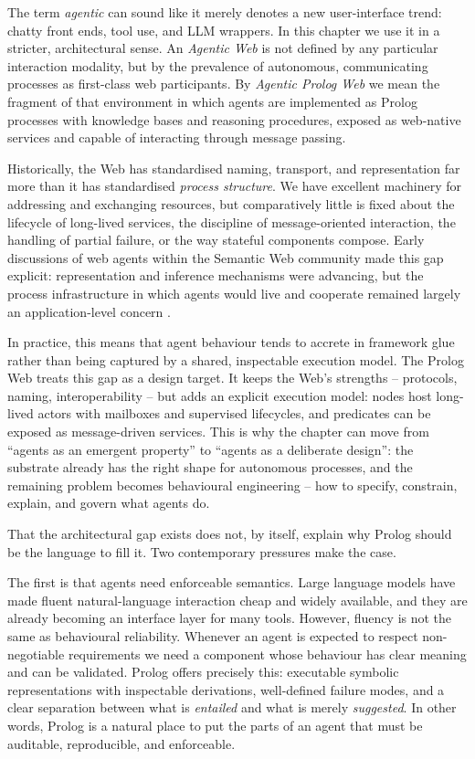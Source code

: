 The term \emph{agentic} can sound like it merely denotes a new user-interface trend: chatty front ends, tool use, and LLM wrappers. In this chapter we use it in a stricter, architectural sense. An \emph{Agentic Web} is not defined by any particular interaction modality, but by the prevalence of autonomous, communicating processes as first-class web participants. By \emph{Agentic Prolog Web} we mean the fragment of that environment in which agents are implemented as Prolog processes with knowledge bases and reasoning procedures, exposed as web-native services and capable of interacting through message passing.

Historically, the Web has standardised naming, transport, and representation far more than it has standardised \emph{process structure}. We have excellent machinery for addressing and exchanging resources, but comparatively little is fixed about the lifecycle of long-lived services, the discipline of message-oriented interaction, the handling of partial failure, or the way stateful components compose. Early discussions of web agents within the Semantic Web community made this gap explicit: representation and inference mechanisms were advancing, but the process infrastructure in which agents would live and cooperate remained largely an application-level concern \citep{hendler2001agents}.

In practice, this means that agent behaviour tends to accrete in framework glue rather than being captured by a shared, inspectable execution model. The Prolog Web treats this gap as a design target. It keeps the Web's strengths -- protocols, naming, interoperability -- but adds an explicit execution model: nodes host long-lived actors with mailboxes and supervised lifecycles, and predicates can be exposed as message-driven services. This is why the chapter can move from ``agents as an emergent property'' to ``agents as a deliberate design'': the substrate already has the right shape for autonomous processes, and the remaining problem becomes behavioural engineering -- how to specify, constrain, explain, and govern what agents do.

That the architectural gap exists does not, by itself, explain why Prolog should be the language to fill it. Two contemporary pressures make the case.

The first is that agents need enforceable semantics. Large language models have made fluent natural-language interaction cheap and widely available, and they are already becoming an interface layer for many tools. However, fluency is not the same as behavioural reliability. Whenever an agent is expected to respect non-negotiable requirements
we need a component whose behaviour has clear meaning and can be validated. Prolog offers precisely this: executable symbolic representations with inspectable derivations, well-defined failure modes, and a clear separation between what is \emph{entailed} and what is merely \emph{suggested}. In other words, Prolog is a natural place to put the parts of an agent that must be auditable, reproducible, and enforceable.

